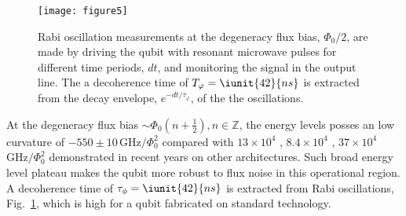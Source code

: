  \begin{figure}[h!]
 	\texttt{[image: figure5]}
 	\caption{Rabi oscillation measurements at the degeneracy flux bias, $ \Phi_0/2 $, are made by driving the qubit with resonant microwave pulses for different time periods, $ dt $, and monitoring the signal in the output line. The a decoherence time of $ T_\varphi = \iunit{42}{ns} $ is extracted from the decay envelope, $ e^{-dt/\tau_\varphi} $, of the the oscillations. \label{fig:rabi}}
 \end{figure}

 \noindent At the degeneracy flux bias $ \sim \Phi_0(n+\frac{1}{2}), n \in \mathbb{Z} $, the energy levels posses an low curvature of $ -550\pm10\,\text{GHz}/\Phi_0^2 $ compared with $ 13\times 10^4 $ \cite{stern2014}, $ 8.4 \times 10^4 $ \cite{zhu2010}, $ 37\times 10^{4} $ \cite{gustavsson2012} $\text{GHz}/\Phi_0^2$ demonstrated in recent years on other architectures. Such broad energy level plateau makes the qubit more robust to flux noise in this operational region. A decoherence time of  $ \tau_\phi = \iunit{42}{ns} $ is extracted from Rabi oscillations, Fig.~\ref{fig:rabi}, which is high for a qubit fabricated on standard technology.
 
 

